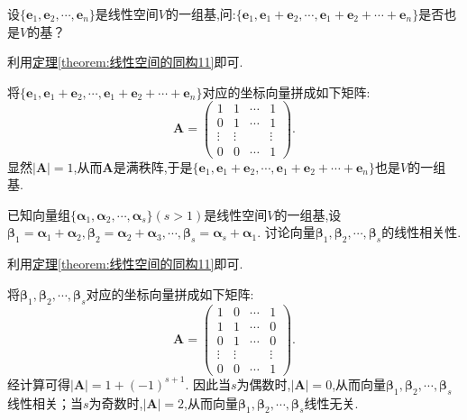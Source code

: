 \documentclass[../../main.tex]{subfiles}%
\begin{document}
\begin{example}
设\(\{\boldsymbol{e}_1,\boldsymbol{e}_2,\cdots,\boldsymbol{e}_n\}\)是线性空间\(V\)的一组基,问:\(\{\boldsymbol{e}_1,\boldsymbol{e}_1+\boldsymbol{e}_2,\cdots,\boldsymbol{e}_1+\boldsymbol{e}_2+\cdots+\boldsymbol{e}_n\}\)是否也是\(V\)的基？
\end{example}
\begin{note}
利用\hyperref[theorem:线性空间的同构11]{定理\ref{theorem:线性空间的同构11}}即可.
\end{note}
\begin{solution}
将\(\{\boldsymbol{e}_1,\boldsymbol{e}_1+\boldsymbol{e}_2,\cdots,\boldsymbol{e}_1+\boldsymbol{e}_2+\cdots+\boldsymbol{e}_n\}\)对应的坐标向量拼成如下矩阵:
\[
\boldsymbol{A}=\begin{pmatrix}
1&1&\cdots&1\\
0&1&\cdots&1\\
\vdots&\vdots&&\vdots\\
0&0&\cdots&1
\end{pmatrix}.
\]
显然\(|\boldsymbol{A}| = 1\),从而\(\boldsymbol{A}\)是满秩阵,于是\(\{\boldsymbol{e}_1,\boldsymbol{e}_1+\boldsymbol{e}_2,\cdots,\boldsymbol{e}_1+\boldsymbol{e}_2+\cdots+\boldsymbol{e}_n\}\)也是\(V\)的一组基. 

\end{solution}

\begin{example}
已知向量组\(\{\boldsymbol{\alpha}_1,\boldsymbol{\alpha}_2,\cdots,\boldsymbol{\alpha}_s\}(s > 1)\)是线性空间\(V\)的一组基,设\(\boldsymbol{\beta}_1=\boldsymbol{\alpha}_1+\boldsymbol{\alpha}_2,\boldsymbol{\beta}_2=\boldsymbol{\alpha}_2+\boldsymbol{\alpha}_3,\cdots,\boldsymbol{\beta}_s=\boldsymbol{\alpha}_s+\boldsymbol{\alpha}_1\). 讨论向量\(\boldsymbol{\beta}_1,\boldsymbol{\beta}_2,\cdots,\boldsymbol{\beta}_s\)的线性相关性.
\end{example}
\begin{note}
利用\hyperref[theorem:线性空间的同构11]{定理\ref{theorem:线性空间的同构11}}即可.
\end{note}
\begin{solution}
将\(\boldsymbol{\beta}_1,\boldsymbol{\beta}_2,\cdots,\boldsymbol{\beta}_s\)对应的坐标向量拼成如下矩阵:
\[
\boldsymbol{A}=\begin{pmatrix}
1&0&\cdots&1\\
1&1&\cdots&0\\
0&1&\cdots&0\\
\vdots&\vdots&&\vdots\\
0&0&\cdots&1
\end{pmatrix}.
\]
经计算可得\(|\boldsymbol{A}| = 1+(-1)^{s + 1}\). 因此当\(s\)为偶数时,\(|\boldsymbol{A}| = 0\),从而向量\(\boldsymbol{\beta}_1,\boldsymbol{\beta}_2,\cdots,\boldsymbol{\beta}_s\)线性相关；当\(s\)为奇数时,\(|\boldsymbol{A}| = 2\),从而向量\(\boldsymbol{\beta}_1,\boldsymbol{\beta}_2,\cdots,\boldsymbol{\beta}_s\)线性无关. 

\end{solution}
\end{document}
